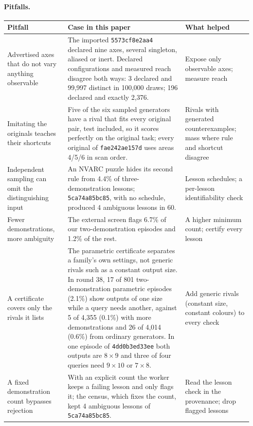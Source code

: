 \documentclass[11pt]{article}
\newcommand{\gen}[1]{\texttt{#1}}
\begin{document}
\paragraph{Pitfalls.}
{\footnotesize
\begin{xltabular}{\linewidth}{>{\raggedright\arraybackslash}p{3.5cm}X>{\raggedright\arraybackslash}p{3.3cm}}
\toprule
Pitfall & Case in this paper & What helped \\
\midrule
\endhead
Advertised axes that do not vary anything observable & The imported \gen{5573cf8e2aa4} declared nine axes, several singleton, aliased or inert. Declared configurations and measured reach disagree both ways: 3 declared and 99,997 distinct in 100,000 draws; 196 declared and exactly 2,376. & Expose only observable axes; measure reach \\
\addlinespace
Imitating the originals teaches their shortcuts & Five of the six sampled generators have a rival that fits every original pair, test included, so it scores perfectly on the original task; every original of \gen{fae242ae157d} uses areas 4/5/6 in scan order. & Rivals with generated counterexamples; mass where rule and shortcut disagree \\
\addlinespace
Independent sampling can omit the distinguishing input & An NVARC puzzle hides its second rule from 4.4\% of three-demonstration lessons; \gen{5ca74a85bc85}, with no schedule, produced 4 ambiguous lessons in 60. & Lesson schedules; a per-lesson identifiability check \\
\addlinespace
Fewer demonstrations, more ambiguity & The external screen flags 6.7\% of our two-demonstration episodes and 1.2\% of the rest. & A higher minimum count; certify every lesson \\
\addlinespace
A certificate covers only the rivals it lists & The parametric certificate separates a family's own settings, not generic rivals such as a constant output size. In round 38, 17 of 801 two-demonstration parametric episodes (2.1\%) show outputs of one size while a query needs another, against 5 of 4,355 (0.1\%) with more demonstrations and 26 of 4,014 (0.6\%) from ordinary generators. In one episode of \gen{4dd0b3ed33ee} both outputs are $8\times9$ and three of four queries need $9\times10$ or $7\times8$. & Add generic rivals (constant size, constant colours) to every check \\
\addlinespace
A fixed demonstration count bypasses rejection & With an explicit count the worker keeps a failing lesson and only flags it; the census, which fixes the count, kept 4 ambiguous lessons of \gen{5ca74a85bc85}. & Read the lesson check in the provenance; drop flagged lessons \\

\end{xltabular}}
\end{document}
